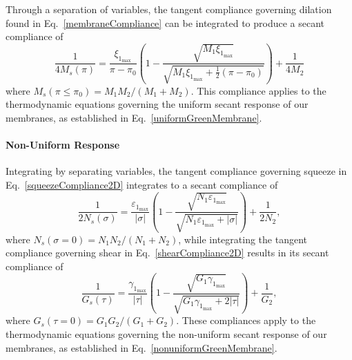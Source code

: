 Through a separation of variables, the tangent compliance governing dilation found in Eq.~\ref{membraneCompliance} can be integrated to produce a secant compliance of
\begin{equation}
    \frac{1}{4M_s (\pi)} = \frac{\xi_{1_{\max}}}{\pi - \pi_0} \left( 
    1 - \frac{\sqrt{M_1 \xi_{1_{\max}}}}
    {\sqrt{M_1 \xi_{1_{\max}} + \tfrac{1}{2} ( \pi - \pi_0 )}} \right) + 
    \frac{1}{4M_2}
\end{equation}
where $M_s (\pi \! \leq \! \pi_0) = M_1 M_2 / ( M_1 + M_2 )$.  This compliance applies to the thermo\-dynamic equations governing the uniform secant response of our membranes, as established in Eq.~\ref{uniformGreenMembrane}.

\paragraph{Non-Uniform Response}

Integrating by separating variables, the tangent compliance governing squeeze in Eq.~\ref{squeezeCompliance2D} integrates to a secant compliance of
\begin{equation}
\frac{1}{2N_s (\sigma)} = 
\frac{\varepsilon_{1_{\max}}}{|\sigma|} \left(
1 - \frac{\sqrt{N_1 \varepsilon_{1_{\max}}}}
{\sqrt{N_1 \varepsilon_{1_{\max}} + | \sigma |}} \right) + 
\frac{1}{2N_2} ,
\end{equation}
where $N_s (\sigma \! = \! 0) = N_1 N_2 / (N_1 + N_2)$, while
integrating the tangent compliance governing shear in Eq.~\ref{shearCompliance2D} results in its secant compliance of
\begin{equation}
    \frac{1}{G_s (\tau)} = 
    \frac{\gamma_{1_{\max}}}{|\tau|} \left(
    1 - \frac{\sqrt{G_1 \gamma_{1_{\max}}}}
    {\sqrt{G_1 \gamma_{1_{\max}} + 2 | \tau |}} \right) + 
    \frac{1}{G_2} ,
\end{equation}
where $G_s (\tau \! = \! 0) = G_1 G_2 / (G_1 + G_2)$.  These compliances apply to the thermo\-dynamic equations governing the non-uniform secant response of our membranes, as established in Eq.~\ref{nonuniformGreenMembrane}.